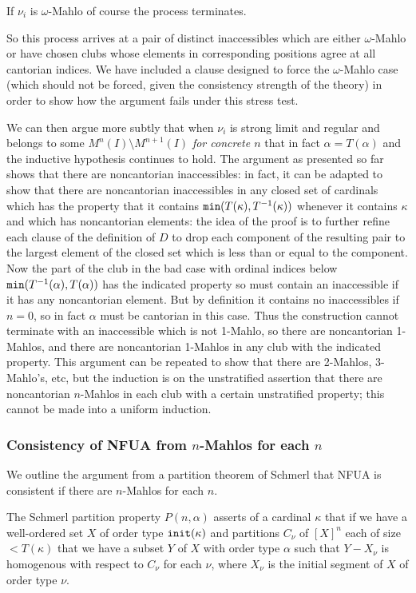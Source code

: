\documentclass[12pt]{article}
\begin{document}
If $\nu_i$ is $\omega$-Mahlo of course the process terminates.

So this process arrives at a pair of distinct inaccessibles which are either $\omega$-Mahlo or have chosen clubs whose elements in corresponding positions agree at all cantorian indices.   We have included a clause designed to force the $\omega$-Mahlo case (which should not be forced, given the consistency strength of the theory) in order to show how the argument fails under this stress test.

We can then argue more subtly that when $\nu_i$ is strong limit and regular and belongs to some $M^n(I) \setminus M^{n+1}(I)$ {\em for concrete $n$\/} that in fact $\alpha=T(\alpha)$ and the inductive hypothesis continues to hold.
The argument as presented so far shows that there are noncantorian inaccessibles:  in fact, it can be adapted to show that there are noncantorian inaccessibles in any closed set of cardinals which has the property that it contains ${\tt min}(T(\kappa),T^{-1}(\kappa))$ whenever it contains $\kappa$ and which has noncantorian elements:  the idea of the proof is to further refine each clause of the definition of $D$ to drop each component of the resulting pair to the largest element of the closed set which is less than or equal to the component.  Now the
part of the club in the bad case with ordinal indices below ${\tt min}(T^{-1}(\alpha),T(\alpha))$ has the indicated property so must contain an inaccessible if it has any noncantorian element.  But by definition it contains no inaccessibles if $n=0$, so in fact $\alpha$ must be cantorian in this case.  Thus the construction
cannot terminate with an inaccessible which is not 1-Mahlo, so there are noncantorian 1-Mahlos, and there are noncantorian 1-Mahlos in any club with the indicated property.  This argument can be repeated to show that there are 2-Mahlos, 3-Mahlo's, etc, but the induction is on the unstratified assertion that there are noncantorian $n$-Mahlos in each club with a certain unstratified property;  this cannot be made into a uniform induction.

\subsubsection{Consistency of NFUA from $n$-Mahlos for each $n$}

We outline the argument from a partition theorem of Schmerl that NFUA is consistent if there are $n$-Mahlos for each $n$.

The Schmerl partition property $P(n,\alpha)$ asserts of a cardinal $\kappa$ that if we have a well-ordered set $X$ of order type ${\tt init}(\kappa)$ and partitions $C_{\nu}$ of $[X]^n$ each of size $<T(\kappa)$  that we have a subset $Y$ of $X$ with order type $\alpha$ such that $Y-X_{\nu}$ is homogenous with respect to $C_\nu$ for each $\nu$, where $X_\nu$ is the initial segment of $X$ of order type $\nu$.
\end{document}
